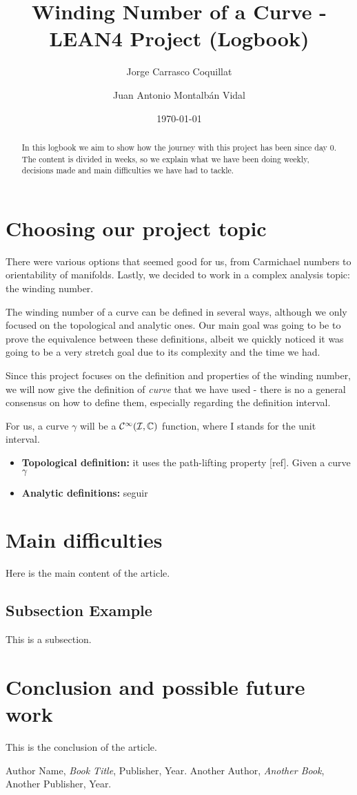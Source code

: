 \documentclass[a4paper,12pt]{article}
\title{Winding Number of a Curve - LEAN4 Project (Logbook)}
\author{Jorge Carrasco Coquillat \and
Juan Antonio Montalbán Vidal}
\date{\today} %
\begin{document}
\maketitle

\begin{abstract}
In this logbook we aim to show how the journey with this project has been since day 0.
The content is divided in weeks, so we explain what we have been doing weekly,
decisions made and main difficulties we have had to tackle.
\end{abstract}

\section{Choosing our project topic}
There were various options that seemed good for us, from Carmichael numbers
to orientability of manifolds. Lastly, we decided to work in a complex analysis topic:
the winding number.

The winding number of a curve can be defined in several ways, although we only
focused on the topological and analytic ones. Our main goal was going to be
to prove the equivalence between these definitions, albeit we quickly noticed
it was going to be a very stretch goal due to its complexity and the time we had.

Since this project focuses on the definition and properties of the winding number,
we will now give the definition of \textit{curve} that we have used - there is no a general
consensus on how to define them, especially regarding the definition interval.

For us, a curve $\gamma$ will be a $\cal{C}^1 (I, \mathbb{C})$ function, where I stands for the unit interval.

\begin{itemize}
  \item \textbf{Topological definition:} it uses the path-lifting property [ref]. Given
  a curve $\gamma$
  \item \textbf{Analytic definitions:} seguir
\end{itemize}

\section{Main difficulties}
Here is the main content of the article.

\subsection{Subsection Example}
This is a subsection.

\section{Conclusion and possible future work}
This is the conclusion of the article.

\begin{thebibliography}{9}
 Author Name, \textit{Book Title}, Publisher, Year.
 Another Author, \textit{Another Book}, Another Publisher, Year.
\end{thebibliography}
\end{document}
